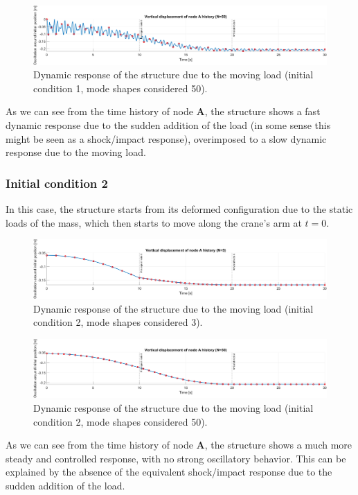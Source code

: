 \begin{figure}[H]
    \centering
    \includegraphics[width=\textwidth]{img/MATLAB/Responses/Moving_load_history_condition_1_modes_50.png}
    \caption{Dynamic response of the structure due to the moving load (initial condition 1, mode shapes considered 50).}
    \label{fig:moving_loads_response_initial_condition_1_modes_50}
\end{figure}

As we can see from the time history of node \textbf{A}, the structure shows a fast dynamic response due to the sudden addition of the load (in some sense this might be seen as a shock/impact response), overimposed to a slow dynamic response due to the moving load.

\subsubsection{Initial condition 2}
\label{subsubsec:initial_condition_2}

In this case, the structure starts from its deformed configuration due to the static loads of the mass, which then starts to move along the crane's arm at $t = 0$.

\begin{figure}[H]
    \centering
    \includegraphics[width=\textwidth]{img/MATLAB/Responses/Moving_load_history_condition_2_modes_3.png}
    \caption{Dynamic response of the structure due to the moving load (initial condition 2, mode shapes considered 3).}
    \label{fig:moving_loads_response_initial_condition_2_modes_3}
\end{figure}

\begin{figure}[H]
    \centering
    \includegraphics[width=\textwidth]{img/MATLAB/Responses/Moving_load_history_condition_2_modes_50.png}
    \caption{Dynamic response of the structure due to the moving load (initial condition 2, mode shapes considered 50).}
    \label{fig:moving_loads_response_initial_condition_2_modes_50}
\end{figure}

As we can see from the time history of node \textbf{A}, the structure shows a much more steady and controlled response, with no strong oscillatory behavior.
This can be explained by the absence of the equivalent shock/impact response due to the sudden addition of the load.